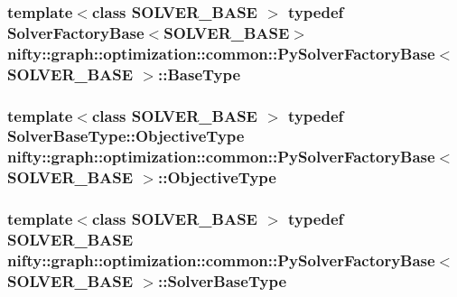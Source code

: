 \subsubsection[{Base\+Type}]{\setlength{\rightskip}{0pt plus 5cm}template$<$class S\+O\+L\+V\+E\+R\+\_\+\+B\+A\+S\+E $>$ typedef {\bf Solver\+Factory\+Base}$<$S\+O\+L\+V\+E\+R\+\_\+\+B\+A\+S\+E$>$ {\bf nifty\+::graph\+::optimization\+::common\+::\+Py\+Solver\+Factory\+Base}$<$ S\+O\+L\+V\+E\+R\+\_\+\+B\+A\+S\+E $>$\+::{\bf Base\+Type}}\label{classnifty_1_1graph_1_1optimization_1_1common_1_1PySolverFactoryBase_a717ac75e0f3ceea674f074249978d220}
\hypertarget{classnifty_1_1graph_1_1optimization_1_1common_1_1PySolverFactoryBase_a79420d727e2e034fe10ee8a0736f7593}{}
\subsubsection[{Objective\+Type}]{\setlength{\rightskip}{0pt plus 5cm}template$<$class S\+O\+L\+V\+E\+R\+\_\+\+B\+A\+S\+E $>$ typedef Solver\+Base\+Type\+::\+Objective\+Type {\bf nifty\+::graph\+::optimization\+::common\+::\+Py\+Solver\+Factory\+Base}$<$ S\+O\+L\+V\+E\+R\+\_\+\+B\+A\+S\+E $>$\+::{\bf Objective\+Type}}\label{classnifty_1_1graph_1_1optimization_1_1common_1_1PySolverFactoryBase_a79420d727e2e034fe10ee8a0736f7593}
\hypertarget{classnifty_1_1graph_1_1optimization_1_1common_1_1PySolverFactoryBase_a12cb76fcc3bb2ae16dd1a4a4da891982}{}
\subsubsection[{Solver\+Base\+Type}]{\setlength{\rightskip}{0pt plus 5cm}template$<$class S\+O\+L\+V\+E\+R\+\_\+\+B\+A\+S\+E $>$ typedef S\+O\+L\+V\+E\+R\+\_\+\+B\+A\+S\+E {\bf nifty\+::graph\+::optimization\+::common\+::\+Py\+Solver\+Factory\+Base}$<$ S\+O\+L\+V\+E\+R\+\_\+\+B\+A\+S\+E $>$\+::{\bf Solver\+Base\+Type}}\label{classnifty_1_1graph_1_1optimization_1_1common_1_1PySolverFactoryBase_a12cb76fcc3bb2ae16dd1a4a4da891982}



